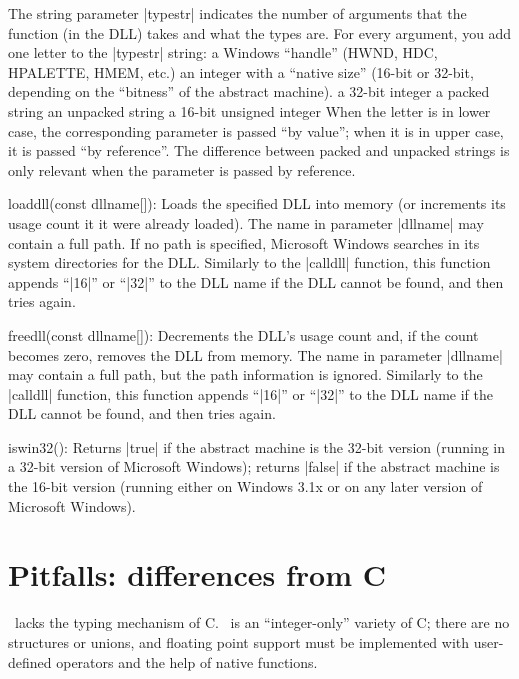   The string parameter |typestr| indicates the number of arguments that the
  function (in the DLL) takes and what the types are. For every argument, you
  add one letter to the |typestr| string:
  \beginlist{2em}\compactlist
   a Windows ``handle'' (HWND, HDC, HPALETTE, HMEM, etc.)
   an integer with a ``native size'' (16-bit or 32-bit, depending
    on the ``bitness'' of the abstract machine).
   a 32-bit integer
   a packed string
   an unpacked string
   a 16-bit unsigned integer
  \endlist
  When the letter is in lower case, the corresponding parameter is passed ``by
  value''; when it is in upper case, it is passed ``by reference''. The
  difference between packed and unpacked strings is only relevant when the
  parameter is passed by reference.
\item loaddll(const dllname[]):
  Loads the specified DLL into memory (or increments its usage count it it were
  already loaded). The name in parameter |dllname| may contain
  a full path. If no path is specified, Microsoft Windows searches in its system
  directories for the DLL. Similarly to the |calldll| function, this function
  appends ``|16|'' or ``|32|'' to the DLL name if the DLL cannot be found, and
  then tries again.
\item freedll(const dllname[]):
  Decrements the DLL's usage count and, if the count becomes zero, removes the
  DLL from memory. The name in parameter |dllname| may contain a full path, but
  the path information is ignored. Similarly to the |calldll| function, this function
  appends ``|16|'' or ``|32|'' to the DLL name if the DLL cannot be found, and
  then tries again.
\item iswin32():
  Returns |true| if the abstract machine is the 32-bit version (running in a
  32-bit version of Microsoft Windows); returns |false| if the abstract machine
  is the 16-bit version (running either on Windows 3.1x or on any later version
  of Microsoft Windows).
\endlist


\vfill\eject
{}%

\chapter{Pitfalls: differences from C}
\beginlist{1em}
\list{\lbullet}
  \Small\ lacks the typing mechanism of C. \Small\ is an ``integer-only'' variety
  of C; there are no structures or unions, and floating point support must be
  implemented with user-defined operators and the help of native functions.

